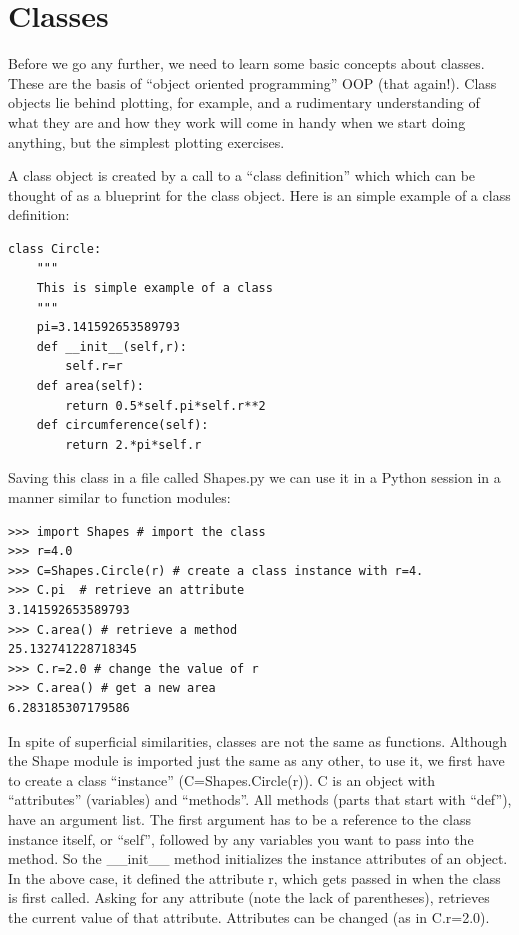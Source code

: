 \documentclass[11pt]{book}
\begin{document}
{{{{\section{Classes}

Before we go any further, we need to learn some basic concepts about classes. These
 are the basis of  ``object oriented programming'' OOP (that again!).   Class objects lie behind plotting, for example, and a rudimentary understanding of what they are and how they work will come in handy when we start doing anything, but the simplest plotting exercises.

  A class object is created by a call  to a ``class definition''  which which can be thought of as a blueprint for the class object.  Here is an simple example of a class definition:

{ \color{blue} \begin{verbatim}
class Circle:
    """
    This is simple example of a class
    """
    pi=3.141592653589793
    def __init__(self,r):
        self.r=r
    def area(self):
        return 0.5*self.pi*self.r**2
    def circumference(self):
        return 2.*pi*self.r

\end{verbatim}}

\noindent Saving this class in a file called {\color{blue}Shapes.py} we can use it in a Python session in a manner similar to function modules:

{ \color{blue} \begin{verbatim}
>>> import Shapes # import the class
>>> r=4.0
>>> C=Shapes.Circle(r) # create a class instance with r=4.
>>> C.pi  # retrieve an attribute
3.141592653589793
>>> C.area() # retrieve a method
25.132741228718345
>>> C.r=2.0 # change the value of r
>>> C.area() # get a new area
6.283185307179586
\end{verbatim}}

\noindent In spite of superficial similarities, classes are not the same as functions.  Although the Shape module is imported just the same as any other, to use it, we first have to create a class ``instance'' ({\color{blue}C=Shapes.Circle(r)}).  {\color{blue}C} is an object with  ``attributes'' (variables) and ``methods''.
All methods (parts that start with ``def''),  have an argument list. The first argument has to be a reference to the class instance itself, or ``self'', followed by any variables you want to pass into the method.  So the {\color{blue}\_\_init\_\_} method initializes the instance attributes of an object.  In the above case, it defined the attribute {\color{blue}r}, which gets passed in when the class is first called.
Asking for any attribute (note the lack of parentheses), retrieves the current value of that attribute.  Attributes can be changed (as in  {\color{blue}C.r=2.0}).

}}}}
\end{document}
